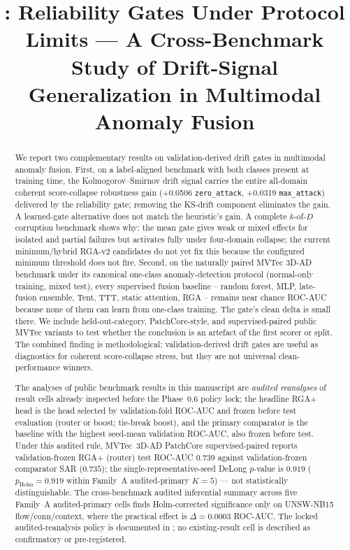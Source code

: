 \documentclass[10pt,conference]{IEEEtran}
\title{\system: Reliability Gates Under Protocol Limits --- A Cross-Benchmark Study of Drift-Signal Generalization in Multimodal Anomaly Fusion}
\author{
  \IEEEauthorblockN{Pratik Niroula}
  \IEEEauthorblockA{
    Independent Researcher
  }
}
\newcommand{\method}{RGA}
\newcommand{\methodplus}{RGA+}
\begin{document}
\maketitle

\begin{abstract}
We report two complementary results on validation-derived drift gates in
multimodal anomaly fusion. First, on a label-aligned benchmark with
both classes present at training time, the Kolmogorov--Smirnov drift
signal carries the entire all-domain coherent score-collapse robustness
gain (+0.0506 \texttt{zero\_attack}, +0.0319 \texttt{max\_attack})
delivered by the reliability gate; removing the KS-drift component
eliminates the gain. A learned-gate alternative does not match the
heuristic's gain. A complete $k$-of-$D$ corruption benchmark shows why:
the mean gate gives weak or mixed effects for isolated and partial failures
but activates fully under four-domain collapse; the current minimum/hybrid
RGA-v2 candidates do not yet fix this because the configured minimum threshold
does not fire. Second, on the naturally paired MVTec 3D-AD benchmark
under its canonical one-class anomaly-detection protocol (normal-only
training, mixed test), every supervised fusion baseline -- random
forest, MLP, late-fusion ensemble, Tent, TTT, static attention,
\method{} -- remains near chance ROC-AUC because none of them can
learn from one-class training. The gate's clean delta is small there. We
include held-out-category, PatchCore-style, and supervised-paired public
MVTec variants to test whether the conclusion is an artefact of the first
scorer or split. The combined finding is methodological:
validation-derived drift gates are useful as diagnostics for coherent
score-collapse stress, but they are not universal clean-performance
winners.

The analyses of public benchmark results in this manuscript are
\emph{audited reanalyses} of result cells already inspected before the
Phase~0.6 policy lock; the headline \methodplus{} head is the head
selected by validation-fold ROC-AUC and frozen before test evaluation
(router or boost; tie-break boost), and the primary comparator is the
baseline with the highest seed-mean validation ROC-AUC, also frozen
before test. Under this audited rule, MVTec~3D-AD PatchCore
supervised-paired reports validation-frozen \methodplus{} (router)
test ROC-AUC $0.739$ against validation-frozen comparator SAR
($0.735$); the single-representative-seed DeLong $p$-value is
$0.919$ ($p_{\mathrm{Holm}}{=}0.919$ within Family~A audited-primary
$K{=}5$) --- not statistically distinguishable. The cross-benchmark
audited inferential summary across five Family~A audited-primary
cells finds Holm-corrected significance only on UNSW-NB15
flow/conn/context, where the practical effect is $\Delta{=}0.0003$
ROC-AUC. The locked audited-reanalysis policy is documented in
; no
existing-result cell is described as confirmatory or pre-registered.


\end{abstract}
\end{document}
